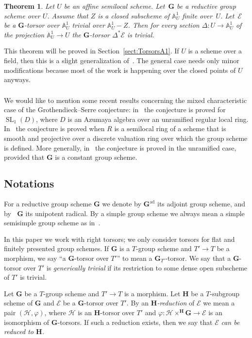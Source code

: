 \documentclass[11pt]{amsart}
\renewcommand{\phi}{\varphi}
\newcommand\A{\mathbb A}
\DeclareMathOperator\Ru{R_u}
\DeclareMathOperator{\ad}{ad}
\DeclareMathOperator{\SL}{SL}
\theoremstyle{plain}
\newtheorem{theorem}{Theorem}
\theoremstyle{definition}
\theoremstyle{remark}
\newcommand\cE{{\mathcal{E}}}
\newcommand\cH{{\mathcal{H}}}
\newcommand\bG{{\mathbf G}}
\newcommand\bH{{\mathbf H}}
\begin{document}
\begin{theorem}\label{th:A1}
Let $U$ be an affine semilocal scheme. Let~$\bG$ be a reductive group scheme over $U$. Assume that $Z$ is a closed subscheme of $\A^1_U$ finite over~$U$. Let~$\cE$ be a $\bG$-torsor over $\A^1_U$ trivial over $\A^1_U-Z$. Then for every section $\Delta\colon U\to\A^1_U$ of the projection $\A^1_U\to U$ the $\bG$-torsor $\Delta^*\cE$ is trivial.
\end{theorem}

This theorem will be proved in Section~\ref{sect:TorsorsA1}. If $U$ is a scheme over a field, then this is a slight generalization of~\cite[Thm.~4]{FedorovGrSerreNonSC}. The general case needs only minor modifications because most of the work is happening over the closed points of $U$ anyways.

\subsubsection{} We would like to mention some recent results concerning the mixed characteristic case of the Grothendieck--Serre conjecture: in~\cite{PaninMixedSL1} the conjecture is proved for $\SL_1(D)$, where $D$ is an Azumaya algebra over an unramified regular local ring. In~\cite{GuoPaninGrSerre} the conjecture is proved when $R$ is a semilocal ring of a scheme that is smooth and projective over a discrete valuation ring over which the group scheme is defined. More generally, in~\cite{GuoLiuGrSerre} the conjecture is proved in the unramified case, provided that $\bG$ is a constant group scheme.

\subsection{Notations} For a reductive group scheme $\bG$ we denote by $\bG^{\ad}$ its adjoint group scheme, and by $\Ru\bG$ its unipotent radical. By a simple group scheme we always mean a simple semisimple group scheme as in~\cite[Exp.~XXIV, 5.3]{SGA3-3}.

In this paper we work with right torsors; we only consider torsors for flat and finitely presented group schemes. If $\bG$ is a $T$-group scheme and $T'\to T$ be a morphism, we say ``a $\bG$-torsor over $T'$'' to mean a $\bG_{T'}$-torsor. We say that a $\bG$-torsor over $T'$ is \emph{generically trivial\/} if its restriction to some dense open subscheme of $T'$ is trivial.

Let $\bG$ be a $T$-group scheme and $T'\to T$ is a morphism. Let $\bH$ be a $T$-subgroup scheme of $\bG$ and $\cE$ be a $\bG$-torsor over $T'$. By an \emph{$\bH$-reduction\/} of $\cE$ we mean a pair $(\cH,\phi)$, where $\cH$ is an $\bH$-torsor over $T'$ and $\phi\colon\cH\times^\bH\bG\to\cE$ is an isomorphism of $\bG$-torsors. If such a reduction exists, then we say that $\cE$ \emph{can be reduced to $\bH$.}
\end{document}
